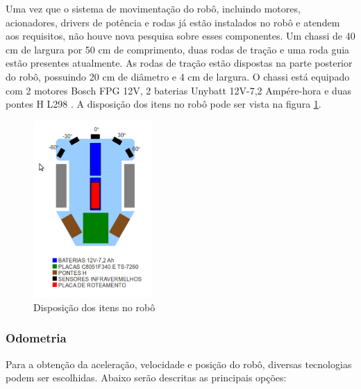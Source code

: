 Uma vez que o sistema de movimentação do robô, incluindo motores, acionadores, drivers de potência e rodas já estão instalados no robô e atendem aos requisitos, não houve nova pesquisa sobre esses componentes. Um chassi de 40 cm de largura por 50 cm de comprimento, duas rodas de tração e uma roda guia estão presentes atualmente. As rodas de tração estão dispostas na parte posterior do robô, possuindo 20 cm de diâmetro e 4 cm de largura. O chassi está equipado com 2 motores Bosch FPG 12V, 2 baterias Unybatt 12V-7,2 Ampére-hora e duas pontes H L298 \cite{bellator_2012}. A disposição dos itens no robô pode ser vista na figura \ref{fig:disposicao_bellator_2012}.

\begin{figure}[H]
\centering
\includegraphics[width=0.4\textwidth]{./figuras/quali/disposicao-robo.png}
\caption{Disposição dos itens no robô}
\label{fig:disposicao_bellator_2012}
\end{figure}

\subsubsection{Odometria}

Para a obtenção da aceleração, velocidade e posição do robô, diversas tecnologias podem ser escolhidas. Abaixo serão descritas as principais opções:

